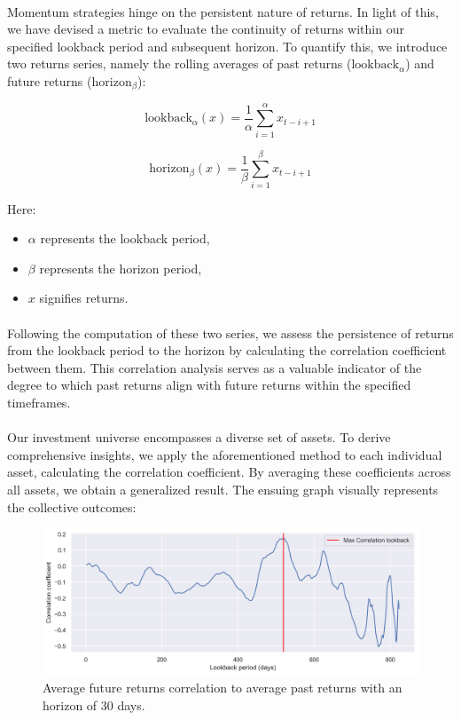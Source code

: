 \documentclass{article}
\begin{document}
\paragraph{}
Momentum strategies hinge on the persistent nature of returns. In light of this, we have devised a metric to evaluate the continuity of returns within our specified lookback period and subsequent horizon. To quantify this, we introduce two returns series, namely the rolling averages of past returns (\(\text{{lookback}}_{\alpha}\)) and future returns (\(\text{{horizon}}_{\beta}\)):

\[
\text{{lookback}}_{\alpha}(x) = \frac{1}{\alpha} \sum_{i=1}^{\alpha} x_{t-i+1}
\]

\[
\text{{horizon}}_{\beta}(x) = \frac{1}{\beta} \sum_{i=1}^{\beta} x_{t-i+1}
\]

Here:
\begin{itemize}
    \item \(\alpha\) represents the lookback period,
    \item \(\beta\) represents the horizon period,
    \item \(x\) signifies returns.
\end{itemize}

\paragraph{}
Following the computation of these two series, we assess the persistence of returns from the lookback period to the horizon by calculating the correlation coefficient between them. This correlation analysis serves as a valuable indicator of the degree to which past returns align with future returns within the specified timeframes.

\paragraph{}
Our investment universe encompasses a diverse set of assets. To derive comprehensive insights, we apply the aforementioned method to each individual asset, calculating the correlation coefficient. By averaging these coefficients across all assets, we obtain a generalized result. The ensuing graph visually represents the collective outcomes:

\begin{figure}[H] %
    \centering
    \includegraphics[width=1\linewidth]{fixed_window.png}
    \caption{Average future returns correlation to average past returns with an horizon of 30 days.}
  \label{fig:fig2}
\end{figure}
\end{document}
